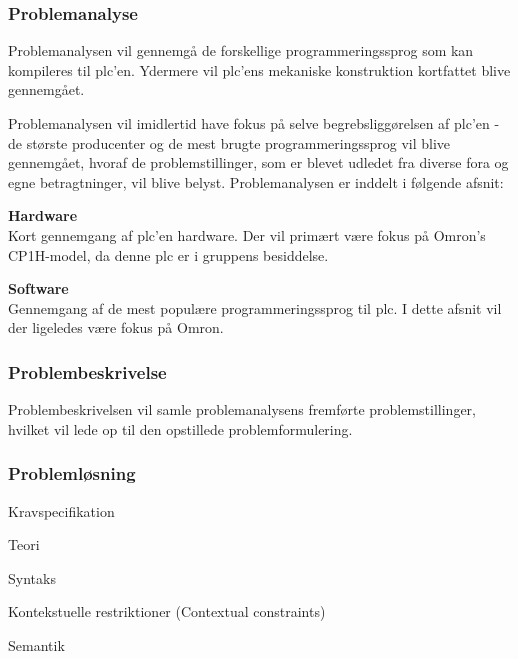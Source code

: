 \label{sec:rapportstruktur}


\subsubsection*{Problemanalyse}
Problemanalysen vil gennemgå de forskellige programmeringssprog som kan kompileres til \gls{plc}'en. Ydermere vil \gls{plc}'ens mekaniske konstruktion kortfattet blive gennemgået. 

Problemanalysen vil imidlertid have fokus på selve begrebsliggørelsen af \gls{plc}'en - de største producenter og de mest brugte programmeringssprog vil blive gennemgået, hvoraf de problemstillinger, som er blevet udledet fra diverse fora og egne betragtninger, vil blive belyst. Problemanalysen er inddelt i følgende afsnit:

\begin{itemize_small}
    \item \textbf{Hardware} \\
    Kort gennemgang af \gls{plc}'en hardware. Der vil primært være fokus på Omron's CP1H-model, da denne \gls{plc} er i gruppens besiddelse.
    \item \textbf{Software} \\
    Gennemgang af de mest populære programmeringssprog til \gls{plc}. I dette afsnit vil der ligeledes være fokus på Omron.  
\end{itemize_small}

\subsubsection*{Problembeskrivelse}
Problembeskrivelsen vil samle problemanalysens fremførte problemstillinger, hvilket vil lede op til den opstillede problemformulering.

\subsubsection*{Problemløsning}

\begin{itemize_small}
    \item Kravspecifikation
    \item Teori
    \item Syntaks
    \item Kontekstuelle restriktioner (Contextual constraints)
    \item Semantik
\end{itemize_small}

